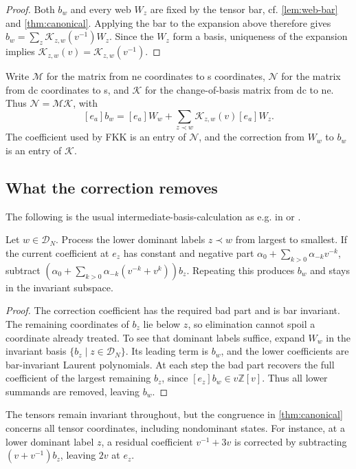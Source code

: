 \documentclass[a4paper,11pt]{amsart}
\newcommand{\Z}{\mathbb Z}
\newcommand{\tpar}{v}
\numberwithin{equation}{subsection}
\theoremstyle{plain}
\theoremstyle{definition}
\theoremstyle{remark}
\begin{document}
\begin{proof}
Both $b_w$ and every web $W_z$ are fixed by the tensor bar, cf. \autoref{lem:web-bar}
and \autoref{thm:canonical}. Applying the bar to the expansion above therefore gives
$b_w=\sum_z \mathcal K_{z,w}(\tpar^{-1})W_z$.
Since the $W_z$ form a basis, uniqueness of the expansion implies
$\mathcal K_{z,w}(\tpar)=\mathcal K_{z,w}(\tpar^{-1})$.
\end{proof}

Write $\mathcal M$ for the matrix from ne coordinates to s coordinates,
$\mathcal N$ for the matrix from dc coordinates to s,
and $\mathcal K$ for the change-of-basis matrix from dc to
ne. Thus $\mathcal N=\mathcal M\mathcal K$, with
\[
[e_a]b_w=[e_a]W_w+\sum_{z\prec w}\mathcal K_{z,w}(\tpar)[e_a]W_z.
\]
The coefficient used by FKK is an entry of $\mathcal N$, and the correction
from $W_w$ to $b_w$ is an entry of $\mathcal K$.

\subsection{What the correction removes}

The following is the usual intermediate-basis-calculation as e.g. in
\cite[Section 4.2]{LeclercToffin} or \cite{TubbenhauerCrystal}.

\begin{lemma}\label{lem:elimination}
Let $w\in\mathcal D_N$. Process the lower dominant labels
$z\prec w$ from largest to smallest. If the current coefficient at
$e_z$ has constant and negative part
$\alpha_0+\sum_{k>0}\alpha_{-k}\tpar^{-k}$, subtract
$(\alpha_0+\sum_{k>0}\alpha_{-k}(\tpar^{-k}+\tpar^k))b_z$.
Repeating this produces $b_w$ and stays in the invariant subspace.
\end{lemma}

\begin{proof}
The correction coefficient has the required bad part and is
bar invariant. The remaining coordinates of $b_z$ lie below $z$, so
elimination cannot spoil a coordinate already treated. To see that
dominant labels suffice, expand $W_w$ in the invariant basis
$\{b_z\mid z\in\mathcal D_N\}$. Its leading term is $b_w$, and the
lower coefficients are bar-invariant Laurent polynomials. At each
step the bad part recovers the full coefficient of the largest
remaining $b_z$, since $[e_z]b_w\in \tpar\Z[\tpar]$. Thus all lower summands
are removed, leaving $b_w$.
\end{proof}

The tensors remain invariant throughout, but the congruence in
\autoref{thm:canonical} concerns all tensor coordinates, including nondominant states. For instance, at a lower
dominant label $z$, a residual coefficient $\tpar^{-1}+3\tpar$ is corrected by
subtracting $(\tpar+\tpar^{-1})b_z$, leaving $2\tpar$ at $e_z$.
\end{document}
